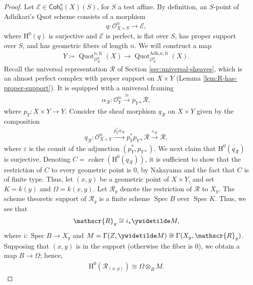 \documentclass{article}
\numberwithin{equation}{section}
\theoremstyle{quest}
\theoremstyle{definition}
\theoremstyle{remark}
\DeclareMathOperator{\Spec}{Spec}
\DeclareMathOperator{\Quot}{Quot}
\DeclareMathOperator{\coker}{coker}
\begin{document}
\begin{proof}
	Let $\mathscr{E}\in \mathsf{Coh}^n_0(X)(S)$, for $S$ a test affine. By definition, an $S$-point of Adhikari's Quot scheme consists of a morphism
	\begin{align*}
		q: \mathscr{O}^n_{X\times S}\to \mathscr{E},
	\end{align*} 
	where $\mathrm H^0(q)$ is surjective and $\mathscr{E}$ is perfect, is flat over $S$, has proper support over $S$, and has geometric fibers of length $n$. We will construct a map
	\begin{align*}
		Y\coloneqq \Quot^{n,\text{fr}}_{\mathscr{O}_X^n}(X)\to \Quot ^{\text{Adh,}n,\text{fr}}_{\mathscr{O}^n_X}(X).
	\end{align*} 
	Recall the universal representation $\mathscr{R}$ of Section \ref{sec:universal-sheaves}, which is an almost perfect complex with proper support on $X\times Y$ (Lemma \ref{lem:R-has-proper-support}). It is equipped with a universal framing
	\begin{align*}
		\alpha_{\mathscr{R}}:\mathscr{O}^n_{Y}\xrightarrow{\cong}p_{Y*}\mathscr{R},
	\end{align*} 
	where $p_Y:X\times Y\to Y$. Consider the sheaf morphism $q_{\mathscr{R}}$ on $X\times Y$ given by the composition
	\begin{align*}
		q_{\mathscr{R}}:\mathscr{O}^n_{X\times Y}\xrightarrow{p_Y^*\alpha_{\mathscr{R}}}p_Y^*p_{Y*}\mathscr{R}\xrightarrow{\varepsilon_{\mathscr{R}}}\mathscr{R},
	\end{align*} 
	where $\varepsilon$ is the counit of the adjunction $(p_Y^*,p_{Y*})$. We next claim that $\mathrm H^0(q_{\mathscr{R}})$ is surjective. Denoting $C=\coker(\mathrm H^0(q_{\mathscr{R}}))$, it is sufficient to show that the restriction of $C$ to every geometric point is 0, by Nakayama and the fact that $C$ is of finite type. Thus, let $(x,y)$ be a geometric point of $X\times Y$, and set $K=k(y)$ and $\Omega=k(x,y)$. Let $\mathscr{R}_y$ denote the restriction of $\mathscr{R}$ to $X_y$. The scheme theoretic support of $\mathscr{R}_y$ is a finite scheme $\Spec B$ over $\Spec K$. Thus, we see that
	\begin{align*}
		\mathscr{R}_y\cong i_*\ywidetilde M,
	\end{align*} 
	where $i:\Spec B \to X_y$ and $M=\Gamma(Z,\ywidetilde M)\cong\Gamma(X_y,\mathscr{R}_y)$. Supposing that $(x,y)$ is in the support (otherwise the fiber is 0), we obtain a map $B\to \Omega$; hence,
	\begin{align*}
		\mathrm H^0(\mathscr{R}_{(x,y)})\cong\Omega\otimes _BM.

\end{align*}
\end{proof}
\end{document}
